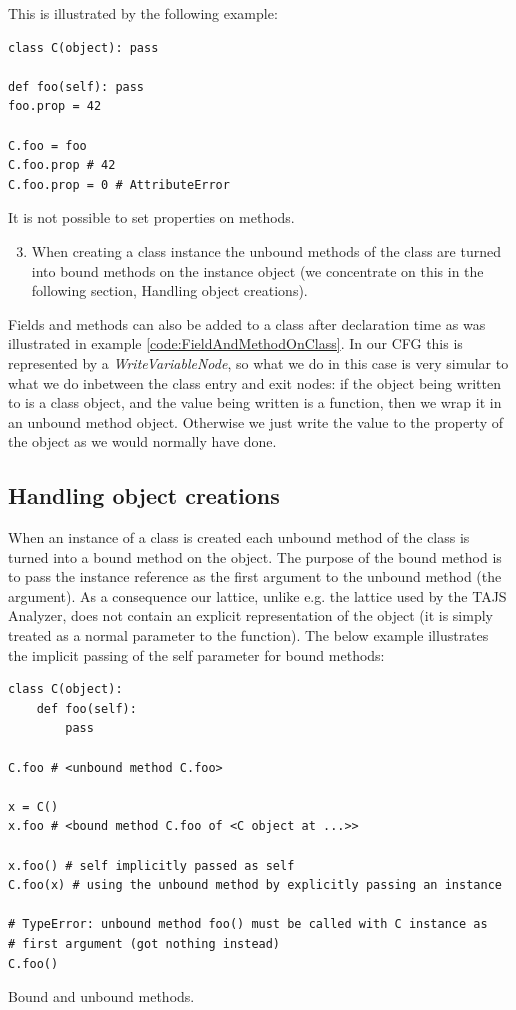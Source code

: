 This is illustrated by the following example:

\begin{listing}[H]
	\begin{verbatim}
class C(object): pass

def foo(self): pass
foo.prop = 42

C.foo = foo
C.foo.prop # 42
C.foo.prop = 0 # AttributeError
	\end{verbatim}
	\caption{It is not possible to set properties on methods.}\label{code:FieldAndMethodOnClass}
\end{listing}

\begin{enumerate}
\setcounter{enumi}{2}
	\item When creating a class instance the unbound methods of the class are turned into bound methods on the instance object (we concentrate on this in the following section, Handling object creations).
\end{enumerate}

Fields and methods can also be added to a class after declaration time as was illustrated in example \ref{code:FieldAndMethodOnClass}. In our CFG this is represented by a \textit{WriteVariableNode}, so what we do in this case is very simular to what we do inbetween the class entry and exit nodes: if the object being written to is a class object, and the value being written is a function, then we wrap it in an unbound method object. Otherwise we just write the value to the property of the object as we would normally have done.


\subsection{Handling object creations}
When an instance of a class is created each unbound method of the class is turned into a bound method on the object. The purpose of the bound method is to pass the instance reference as the first argument to the unbound method (the  argument). As a consequence our lattice, unlike e.g. the lattice used by the TAJS Analyzer, does not contain an explicit representation of the  object (it is simply treated as a normal parameter to the function). The below example illustrates the implicit passing of the self parameter for bound methods:

\begin{listing}[H]
	\begin{verbatim}
class C(object):
	def foo(self):
		pass

C.foo # <unbound method C.foo>

x = C()
x.foo # <bound method C.foo of <C object at ...>>

x.foo() # self implicitly passed as self
C.foo(x) # using the unbound method by explicitly passing an instance

# TypeError: unbound method foo() must be called with C instance as 
# first argument (got nothing instead)
C.foo()
	\end{verbatim}
	\caption{Bound and unbound methods.}\label{code:BoundAndUnboundMethodsOnClass}
\end{listing}

